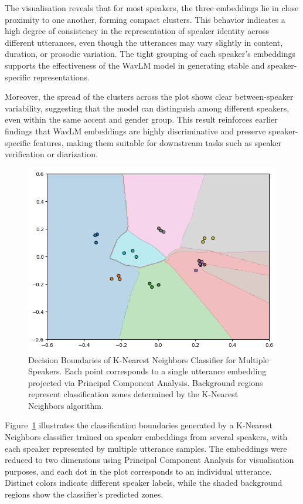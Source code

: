 \documentclass[conference]{IEEEtran}
\begin{document}
	The visualisation reveals that for most speakers, the three embeddings lie in close proximity to one another, forming compact clusters. This behavior indicates a high degree of consistency in the representation of speaker identity across different utterances, even though the utterances may vary slightly in content, duration, or prosodic variation. The tight grouping of each speaker's embeddings supports the effectiveness of the WavLM model in generating stable and speaker-specific representations.
	
	Moreover, the spread of the clusters across the plot shows clear between-speaker variability, suggesting that the model can distinguish among different speakers, even within the same accent and gender group. This result reinforces earlier findings that WavLM embeddings are highly discriminative and preserve speaker-specific features, making them suitable for downstream tasks such as speaker verification or diarization.
	
	\begin{figure}[h]
		\centering
		\includegraphics[width=0.7\linewidth]{img/img-knn-speaker-separation.png}
		\caption{Decision Boundaries of K-Nearest Neighbors Classifier for Multiple Speakers. Each point corresponds to a single utterance embedding projected via Principal Component Analysis. Background regions represent classification zones determined by the K-Nearest Neighbors algorithm.}
		\label{fig:knn-speaker}
	\end{figure}
	
	
	Figure~\ref{fig:knn-speaker} illustrates the classification boundaries generated by a K-Nearest Neighbors classifier trained on speaker embeddings from several speakers, with each speaker represented by multiple utterance samples. The embeddings were reduced to two dimensions using Principal Component Analysis for visualisation purposes, and each dot in the plot corresponds to an individual utterance. Distinct colors indicate different speaker labels, while the shaded background regions show the classifier's predicted zones.
	
\end{document}
